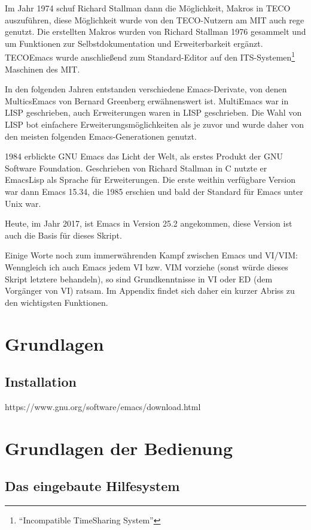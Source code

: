\documentclass[12pt,ngerman]{scrbook}
\begin{document}
Im Jahr 1974 schuf Richard Stallman dann die Möglichkeit, Makros in TECO auszuführen, diese Möglichkeit wurde von den TECO-Nutzern am MIT auch rege genutzt. Die erstellten Makros wurden von Richard Stallman 1976 gesammelt und um Funktionen zur Selbstdokumentation und Erweiterbarkeit ergänzt. TECOEmacs wurde anschließend zum Standard-Editor auf den ITS-Systemen\footnote{\enquote{Incompatible TimeSharing System}} Maschinen des MIT.

In den folgenden Jahren entstanden verschiedene Emacs-Derivate, von denen MulticsEmacs von Bernard Greenberg erwähnenswert ist. MultiEmacs war in LISP geschrieben, auch Erweiterungen waren in LISP geschrieben. Die Wahl von LISP bot einfachere Erweiterungsmöglichkeiten als je zuvor und wurde daher von den meisten folgenden Emacs-Generationen genutzt. 

1984 erblickte GNU Emacs das Licht der Welt, als erstes Produkt der GNU Software Foundation. Geschrieben von Richard Stallman in C nutzte er EmacsLisp als Sprache für Erweiterungen. Die erste weithin verfügbare Version war dann Emacs 15.34, die 1985 erschien und bald der Standard für Emacs unter Unix war.

Heute, im Jahr 2017, ist Emacs in Version 25.2 angekommen, diese Version ist auch die Basis für dieses Skript.

Einige Worte noch zum immerwährenden Kampf zwischen Emacs und VI/VIM: Wenngleich ich auch Emacs jedem VI bzw. VIM vorziehe (sonst würde dieses Skript letztere behandeln), so sind Grundkenntnisse in VI oder ED (dem Vorgänger von VI) ratsam. Im Appendix findet sich daher ein kurzer Abriss zu den wichtigsten Funktionen.

\chapter{Grundlagen}

\section{Installation}

https://www.gnu.org/software/emacs/download.html

\chapter{Grundlagen der Bedienung}

\section{Das eingebaute Hilfesystem}
\end{document}
